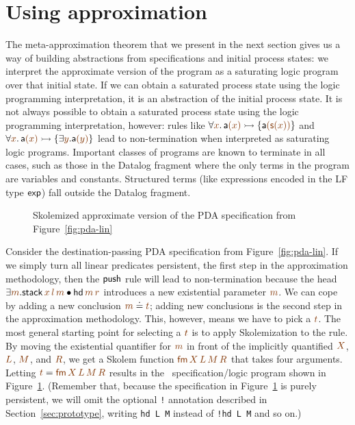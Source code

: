 \section{Using approximation}
\label{sec:pda-approxme}


The meta-approximation theorem that we present in the next section
gives us a way of building abstractions from specifications and
initial process states: we interpret the approximate version of the
program as a saturating logic program over that initial state. If we
can obtain a saturated process state using the logic programming
interpretation, it is an abstraction of the initial process state. It
is not always possible to obtain a saturated process state using the
logic programming interpretation, however: rules like $\forall
\lf{x}.\,{\sf a}\lf{(x)} \lefti \{ {\sf a}\lf{({\sf s}(x))} \}$ and
$\forall \lf{x}.\,{\sf a}\lf{(x)} \lefti \{ \exists \lf{y}. {\sf
  a}\lf{(y)} \}$ lead to non-termination when interpreted as
saturating logic programs. Important classes of programs are known to
terminate in all cases, such as those in the Datalog fragment where
the only terms in the program are variables and constants. Structured
terms (like expressions encoded in the LF type ${\sf exp}$) fall
outside the Datalog fragment.

\begin{figure}
\caption{Skolemized approximate version of the PDA specification from
Figure~\ref{fig:pda-lin}}
\label{fig:pda-pers}
\end{figure}

Consider the destination-passing PDA specification from
Figure~\ref{fig:pda-lin}. If we simply turn all linear predicates
persistent, the first step in the approximation methodology, then the
${\sf push}$ rule will lead to non-termination because the head
$\exists \lf{m}. {\sf stack}\,\lf{x}\,\lf{l}\,\lf{m} \fuse {\sf
  hd}\,\lf{m}\,\lf{r}$ introduces a new existential parameter
$\lf{m}$.  We can cope by adding a new conclusion $\lf{m} \doteq
\lf{t}$; adding new conclusions is the second step in the
approximation methodology. This, however, means we have to pick a
$\lf{t}$.  The most general starting point for selecting a $\lf{t}$ is
to apply Skolemization to the rule. By moving the existential
quantifier for $\lf{m}$ in front of the implicitly quantified
$\lf{X}$, $\lf{L}$, $\lf{M}$, and $\lf{R}$, we get a Skolem function
$\lf{{\sf fm}\,X\,L\,M\,R}$ that takes four arguments. Letting $\lf{t}
= \lf{{\sf fm}\,X\,L\,M\,R}$ results in the \sls~specification/logic
program shown in Figure~\ref{fig:pda-pers}. (Remember that, because
the specification in Figure~\ref{fig:pda-pers} is purely persistent,
we will omit the optional \verb|!| annotation described in
Section~\ref{sec:prototype}, writing \verb|hd L M| instead of
\verb|!hd L M| and so on.)

